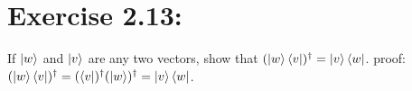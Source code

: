 \section{\Large Exercise 2.13:}If $\ket{w}$ and $\ket{v}$ are any two vectors,
show that $(\ket{w}\bra{v})^\dagger = \ket{v}\bra{w}$.
\newline
{\large proof:}
$(\ket{w}\bra{v})^\dagger = (\bra{v})^\dagger (\ket{w})^\dagger 
= \ket{v}\bra{w}$.

